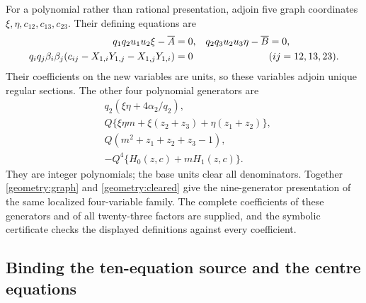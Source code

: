 \documentclass[11pt,a4paper]{article}
\theoremstyle{remark}\newtheorem{remark}[theorem]{Remark}
\newcommand{\Ab}{\overline A}\newcommand{\Bb}{\overline B}
\begin{document}
For a polynomial rather than rational presentation, adjoin five graph
coordinates \(\xi,\eta,c_{12},c_{13},c_{23}\). Their defining equations
are
\begin{align}
 q_1q_2u_1u_2\xi-\Ab&=0,&
 q_2q_3u_2u_3\eta-\Bb&=0,\notag\\
 q_iq_j\beta_i\beta_j
 (c_{ij}-X_{1,i}Y_{1,j}-X_{1,j}Y_{1,i})&=0
 &&(ij=12,13,23).
 \label{geometry:graph}
\end{align}
Their coefficients on the new variables are units, so these variables
adjoin unique regular sections. The other four polynomial generators are
\begin{equation}\label{geometry:cleared}
 \begin{split}
 &q_2(\xi\eta+4\alpha_2/q_2),\\
 &Q\{\xi\eta m+\xi(z_2+z_3)+\eta(z_1+z_2)\},\\
 &Q(m^2+z_1+z_2+z_3-1),\\
 &-Q^4\{H_0(z,c)+mH_1(z,c)\}.
 \end{split}
\end{equation}
They are integer polynomials; the base units clear all denominators.
Together \eqref{geometry:graph} and \eqref{geometry:cleared} give the
nine-generator presentation of the same localized four-variable family.
The complete coefficients of these generators and of all twenty-three
factors are supplied, and the symbolic certificate checks the displayed
definitions against every coefficient.

\subsection{Binding the ten-equation source and the centre equations}
\label{geometry:centre-source}
\end{document}
